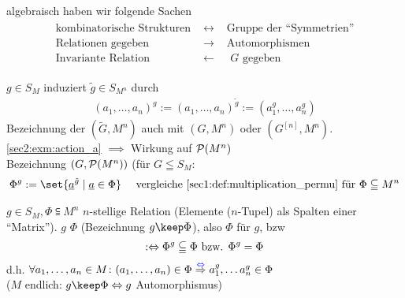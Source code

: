 algebraisch haben wir folgende Sachen
\begin{align*}
	\begin{matrix}
		\text{kombinatorische Strukturen } &\leftrightarrow& \text{ Gruppe der ``Symmetrien''}\\
		\text{Relationen gegeben }&\rightarrow& \text{ Automorphismen}\\
		\text{Invariante Relation } &\leftarrow& \text{ $G$ gegeben}
	\end{matrix}
\end{align*}
\begin{*erinnerung}
	$g \in S_M$ induziert $\tilde{g} \in S_{M^n}$ durch
	\begin{align*}
		(a_1,\dots,a_n)^g := (a_1, \dots,a_n)^{\tilde{g}} := (a_1^g, \dots,a_n^g)
	\end{align*}
	Bezeichnung der $(\tilde{G},M^n)$ auch mit $(G,M^n)$ oder $(G^{[n]},M^n)$.\\
	\cref{sec2:exm:action_a} $\implies$ Wirkung auf $\mathcal{P}(M^n)$\\
	Bezeichnung $(G, \mathcal{P}(M^n))$ (für $G \leqq S_M$:
	\begin{align*}
		\Phi^g := \set{\ul{a}^{\tilde{g}} \mid \ul{a} \in \Phi} \quad \text{ vergleiche \cref{sec1:def:multiplication_permu} für } \Phi \subseteqq M^n
	\end{align*}
\end{*erinnerung}
\begin{definition}
	$g \in S_M, \Phi \subseteqq M^n$ $n$-stellige Relation (Elemente ($n$-Tupel) als Spalten einer ``Matrix''). $g$  $\Phi$ (Bezeichnung $g \keep \Phi$), also $\Phi$  für $g$, bzw \\
	\begin{align*}
		:\Leftrightarrow \Phi^g \subseteqq \Phi \text{ bzw. $\Phi^g = \Phi$}
	\end{align*}
	d.h. $\forall a_1, \dots, a_n \in M\colon (a_1,\dots,a_n) \in \Phi \overset{\textcolor{blue}{\Leftrightarrow}}{\Rightarrow} a_1^g, \dots a_n^g \in \Phi$\\
	($M$ endlich: $g \keep \Phi \equival g$ Automorphismus)
\end{definition}
